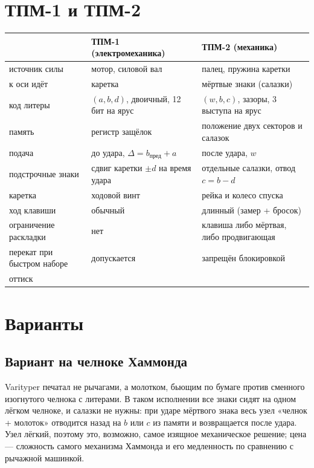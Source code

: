 \section{ТПМ-1 и ТПМ-2}

\begin{center}\small
\begin{tabularx}{\linewidth}{@{}>{\raggedright}p{40mm}>{\raggedright}X>{\raggedright\arraybackslash}X@{}}
\toprule
& ТПМ-1 (электромеханика) & ТПМ-2 (механика) \\
\midrule
источник силы & мотор, силовой вал & палец, пружина каретки \\
к оси идёт & каретка & мёртвые знаки (салазки) \\
код литеры & $(a, b, d)$, двоичный, 12 бит на ярус & $(w, b, c)$, зазоры, 3 выступа на ярус \\
память & регистр защёлок & положение двух секторов и салазок \\
подача & до удара, $\Delta = b_{\text{пред}} + a$ & после удара, $w$ \\
подстрочные знаки & сдвиг каретки $\pm d$ на время удара & отдельные салазки, отвод $c = b - d$ \\
каретка & ходовой винт & рейка и колесо спуска \\
ход клавиши & обычный & длинный (замер + бросок) \\
ограничение раскладки & нет & клавиша либо мёртвая, либо продвигающая \\
перекат при быстром наборе & допускается & запрещён блокировкой \\
оттиск & \multicolumn{2}{c}{одинаковый (проверено моделью)} \\
\bottomrule
\end{tabularx}
\end{center}

\section{Варианты}

\subsection*{Вариант на челноке Хаммонда}

Varityper печатал не рычагами, а молотком, бьющим по бумаге против сменного изогнутого челнока с литерами. В таком исполнении все знаки сидят на одном лёгком челноке, и салазки не нужны: при ударе мёртвого знака весь узел «челнок + молоток» отводится назад на $b$ или $c$ из памяти и возвращается после удара. Узел лёгкий, поэтому это, возможно, самое изящное механическое решение; цена — сложность самого механизма Хаммонда и его медленность по сравнению с рычажной машинкой.

